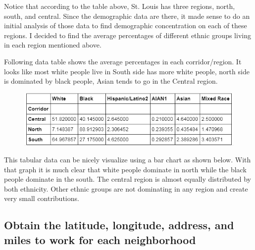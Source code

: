 \documentclass[11pt]{article}
\makeatletter
\def\maxwidth{\ifdim\Gin@nat@width>\linewidth\linewidth
    \else\Gin@nat@width\fi}
\let\Oldincludegraphics\includegraphics
\renewcommand{\includegraphics}[1]{\Oldincludegraphics[width=.95\maxwidth]{#1}}
\makeatother
\begin{document}
Notice that according to the table above, St. Louis has three regions, north, south, and central. Since the demographic data are there, it made sense to do an initial analysis of those data to find demographic concentration on each of these regions. I decided to find the average percentages of different ethnic groups living in each region mentioned above.

Following data table shows the average percentages in each corridor/region. It looks like most white people live in South side has more white people, north side is dominated by black people, Asian tends to go in the Central region. 

\begin{center}
\begin{figure}[h!]
  \includegraphics{Battle_of_Neighborhood_V2_files/avg_table.png}
\end{figure}
\end{center}

            
This tabular data can be nicely visualize using a bar chart as shown below. With that graph it is much clear that white people dominate in north while the black people dominate in the south. The central region is almost equally distributed by both ethnicity. Other ethnic groups are not dominating in any region and create very small contributions.

    \begin{center}
    \end{center}
    
    
    \hypertarget{obtain-the-latitude-longitude-address-and-miles-to-work-for-each-neighborhood}{%
\subsection{Obtain the latitude, longitude, address, and miles to
work for each
neighborhood}\label{obtain-the-latitude-longitude-address-and-miles-to-work-for-each-neighborhood}}
\end{document}
